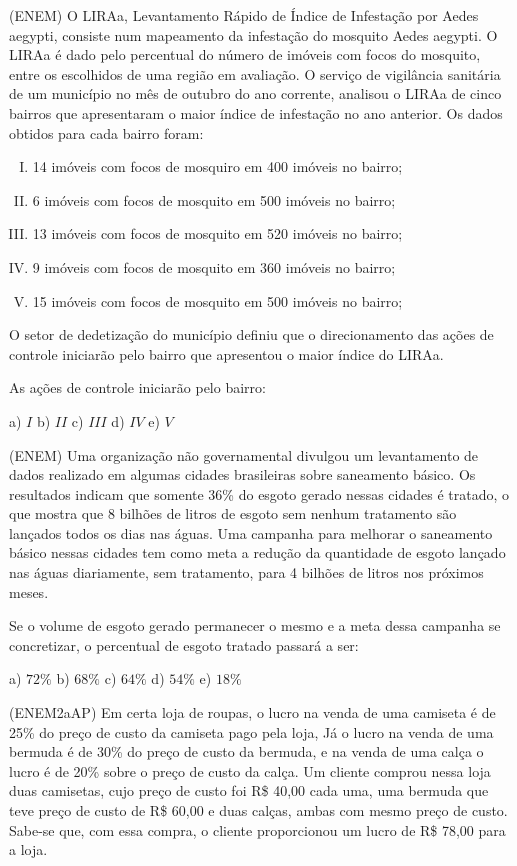 \begin{multicols*}{2}
	\execnum (ENEM) O LIRAa, Levantamento Rápido de Índice de Infestação por Aedes aegypti, consiste num mapeamento da infestação do mosquito Aedes aegypti. O LIRAa é dado pelo percentual do número de imóveis com focos do mosquito, entre os escolhidos de uma região em avaliação. O serviço de vigilância sanitária de um município no mês de outubro do ano corrente, analisou o LIRAa de cinco bairros que apresentaram o maior índice de infestação no ano anterior. Os dados obtidos para cada bairro foram:
	\begin{enumerate}[I.]
		\item 14 imóveis com focos de mosquiro em 400 imóveis no bairro;
		\item 6 imóveis com focos de mosquito em 500 imóveis no bairro;
		\item 13 imóveis com focos de mosquito em 520 imóveis no bairro;
		\item 9 imóveis com focos de mosquito em 360 imóveis no bairro;
		\item 15 imóveis com focos de mosquito em 500 imóveis no bairro;
	\end{enumerate}

	O setor de dedetização do município definiu que o direcionamento das ações de controle iniciarão pelo bairro
	que apresentou o maior índice do LIRAa.

	As ações de controle iniciarão pelo bairro:

	a) $ I $ b) $ II $ c) $III $ d) $ IV $ e) $ V $

	\execnum (ENEM) Uma organização não governamental divulgou um levantamento de dados realizado em algumas cidades
	brasileiras sobre saneamento básico. Os resultados indicam que somente 36\% do esgoto gerado nessas cidades é tratado, o que mostra que 8 bilhões de litros de esgoto sem nenhum tratamento são lançados todos os dias nas águas. Uma campanha para melhorar o saneamento básico nessas cidades tem como meta a redução da quantidade de esgoto lançado nas águas diariamente, sem tratamento, para 4 bilhões de litros nos próximos meses.

	Se o volume de esgoto gerado permanecer o mesmo e a meta dessa campanha se concretizar, o percentual de esgoto tratado passará a ser:

	a) $72\% $ b) $68\% $ c) $64\% $ d) $54\% $ e) $18\% $

	\execnum (ENEM2aAP) Em certa loja de roupas, o lucro na venda de uma camiseta é de 25\% do preço de custo da camiseta pago pela loja, Já o lucro na venda de uma bermuda é de 30\% do preço de custo da bermuda, e na venda de uma calça o lucro é de 20\% sobre o preço de custo da calça. Um cliente comprou nessa loja duas camisetas, cujo preço de custo foi R\$ 40,00 cada uma, uma bermuda que teve preço de custo de R\$ 60,00 e duas calças, ambas com mesmo
	preço de custo. Sabe-se que, com essa compra, o cliente proporcionou um lucro de R\$ 78,00 para a loja.


\end{multicols*}
